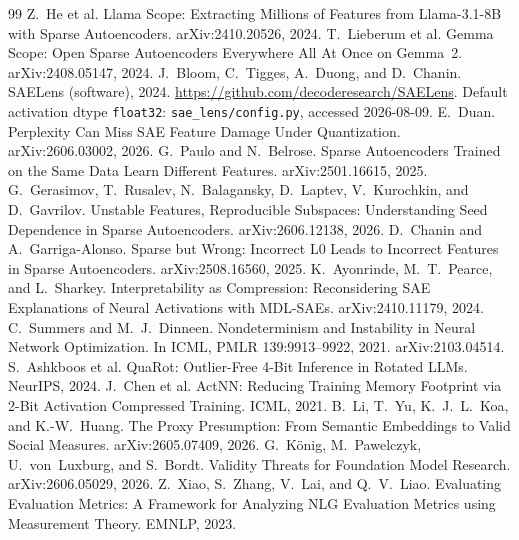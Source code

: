\documentclass{article}
\begin{document}

\begin{thebibliography}{99}
 Z.~He et al.
\newblock Llama Scope: Extracting Millions of Features from Llama-3.1-8B
with Sparse Autoencoders.
\newblock arXiv:2410.20526, 2024.
 T.~Lieberum et al.
\newblock Gemma Scope: Open Sparse Autoencoders Everywhere All At Once on
Gemma~2.
\newblock arXiv:2408.05147, 2024.
 J.~Bloom, C.~Tigges, A.~Duong, and D.~Chanin.
\newblock SAELens (software), 2024. \url{https://github.com/decoderesearch/SAELens}.
\newblock Default activation dtype \texttt{float32}: \texttt{sae\_lens/config.py}, accessed 2026-08-09.
 E.~Duan.
\newblock Perplexity Can Miss SAE Feature Damage Under Quantization.
\newblock arXiv:2606.03002, 2026.
 G.~Paulo and N.~Belrose.
\newblock Sparse Autoencoders Trained on the Same Data Learn Different
Features.
\newblock arXiv:2501.16615, 2025.
 G.~Gerasimov, T.~Rusalev, N.~Balagansky,
D.~Laptev, V.~Kurochkin, and D.~Gavrilov.
\newblock Unstable Features, Reproducible Subspaces: Understanding Seed
Dependence in Sparse Autoencoders.
\newblock arXiv:2606.12138, 2026.
 D.~Chanin and A.~Garriga-Alonso.
\newblock Sparse but Wrong: Incorrect L0 Leads to Incorrect Features in
Sparse Autoencoders.
\newblock arXiv:2508.16560, 2025.
 K.~Ayonrinde, M.~T.~Pearce, and L.~Sharkey.
\newblock Interpretability as Compression: Reconsidering SAE Explanations of
Neural Activations with MDL-SAEs.
\newblock arXiv:2410.11179, 2024.
 C.~Summers and M.~J.~Dinneen.
\newblock Nondeterminism and Instability in Neural Network Optimization.
\newblock In ICML, PMLR 139:9913--9922, 2021. arXiv:2103.04514.
 S.~Ashkboos et al.
\newblock QuaRot: Outlier-Free 4-Bit Inference in Rotated LLMs.
\newblock NeurIPS, 2024.
 J.~Chen et al.
\newblock ActNN: Reducing Training Memory Footprint via 2-Bit Activation
Compressed Training.
\newblock ICML, 2021.
 B.~Li, T.~Yu, K.~J.~L.~Koa, and
K.-W.~Huang.
\newblock The Proxy Presumption: From Semantic Embeddings to Valid
Social Measures.
\newblock arXiv:2605.07409, 2026.
 G.~K\"onig, M.~Pawelczyk, U.~von~Luxburg,
and S.~Bordt.
\newblock Validity Threats for Foundation Model Research.
\newblock arXiv:2606.05029, 2026.
 Z.~Xiao, S.~Zhang, V.~Lai, and Q.~V.~Liao.
\newblock Evaluating Evaluation Metrics: A Framework for Analyzing NLG
Evaluation Metrics using Measurement Theory.
\newblock EMNLP, 2023.

\end{thebibliography}
\end{document}
